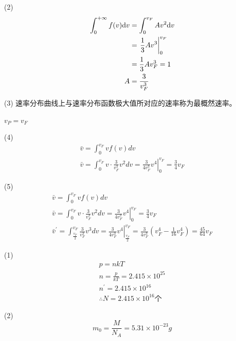 (2)
\begin{align*}
\int _ { 0 } ^ {+\infty}f(v)\mathrm{d}v
&=\int _ { 0 } ^ {v_F}Av^2\mathrm{d}v\\
&=\left. \dfrac { 1 } { 3 } A v ^ { 3 } \right| _ { 0 } ^ { v _ { F } }\\
&=\dfrac { 1 } { 3 } A v_F^3= 1 \\ 
A&=\dfrac{3}{ v_F^3 }
\end{align*}

(3)
速率分布曲线上与速率分布函数极大值所对应的速率称为最概然速率。

\therefore $v_P=v_F$

(4)
\begin{gather*}
{ \bar { v } = \int _ { 0 } ^ { v _ { F } } v f ( v ) d v } \\
 { \bar { v } = \int _ { 0 } ^ { v _ { F } } v \cdot \frac { 3 } { v _ { F } ^ { 3 } } v ^ { 2 } d v = \left. \frac { 3 } { 4 v _ { F } ^ { 3 } } v ^ { 4 } \right| _ { 0 } ^ { v _ { F } } = \frac { 3 } { 4 } v _ { F } } 
\end{gather*}

(5)
\begin{gather*}
 { \bar { v } = \int _ { 0 } ^ { v _ { F } } v f ( v ) d v } \\
{ \bar { v } = \int _ { 0 } ^ { v _ { F } } v \cdot \frac { 3 } { v _ { F } ^ { 3 } } v ^ { 2 } d v = \left. \frac { 3 } { 4 v _ { F } ^ { 3 } } v ^ { 4 } \right| _ { 0 } ^ { v _ { F } } = \frac { 3 } { 4 } v _ { F } } \\ { \bar { v } ^ { \prime } = \int _ { \frac { v _ { F } } { 2 } } ^ { v _ { F } } \frac { 3 } { v _ { F } ^ { 3 } } v ^ { 3 } d v = \left. \frac { 3 } { 4 v _ { F } ^ { 3 } } v ^ { 4 } \right| _ { \frac { v _ { F } } { 2 } } ^ { v _ { F } } = \frac { 3 } { 4 v _ { F } ^ { 3 } } \left( v _ { F } ^ { 4 } - \frac { 1 } { 16 } v _ { F } ^ { 4 } \right) = \frac { 45 } { 64 } v _ { F } }
\end{gather*}

\exercise

\solve
(1)
\begin{gather*}
{ p = n k T } \\ 
{ n = \frac { p } { k T } = 2.415 \times 10 ^ { 25 } } \\ 
{ n ^ { \prime } = 2.415 \times 10 ^ { 16 } } \\
 { \therefore N = 2.415 \times 10 ^ { 16 } \mbox{个} } 
\end{gather*}

(2)
$$
m _ { 0 } = \frac { M } { N _ { A } } = 5.31 \times 10 ^ { - 23 } g
$$

